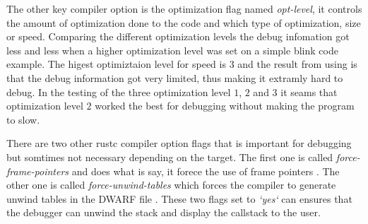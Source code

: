 The other key compiler option is the optimization flag named \emph{opt-level}, it controls the amount of optimization done to the code and which type of optimization, size or speed.
Comparing the different optimization levels the debug infomation got less and less when a higher optimization level was set on a simple blink code example.
The higest optimiztaion level for speed is $3$ and the result from using is that the debug information got very limited, thus making it extramly hard to debug.
In the testing of the three optimization level $1$, $2$ and $3$ it seams that optimization level $2$ worked the best for debugging without making the program to slow.


There are two other \gls{rustc} compiler option flags that is important for debugging but somtimes not necessary depending on the target.
The first one is called \emph{force-frame-pointers} and does what is say, it forece the use of frame pointers \cite{rustc-book-codegen}.
The other one is called \emph{force-unwind-tables} which forces the compiler to generate unwind tables in the \gls{DWARF} file \cite{rustc-book-codegen}.
These two flags set to \emph{`yes`} can ensures that the debugger can unwind the stack and display the callstack to the user.


%
%

